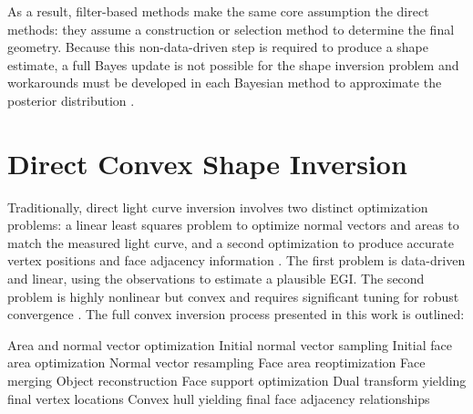 As a result, filter-based methods make the same core assumption the direct methods: they assume a construction or selection method to determine the final geometry. Because this non-data-driven step is required to produce a shape estimate, a full Bayes update is not possible for the shape inversion problem and workarounds must be developed in each Bayesian method to approximate the posterior distribution \cite{linares2012, linares2014space, campbell2023, linares2018space}.


\graphicspath{{/Users/liamrobinson/Documents/msthesis/static_images/aas_2022_figs}}

\section{Direct Convex Shape Inversion}

Traditionally, direct light curve inversion involves two distinct optimization problems: a linear least squares problem to optimize normal vectors and areas to match the measured light curve, and a second optimization to produce accurate vertex positions and face adjacency information \cite{fan2020thesis, kaasalainen2000, kaas2001shape, cabrera2021}. The first problem is data-driven and linear, using the observations to estimate a plausible EGI. The second problem is highly nonlinear but convex and requires significant tuning for robust convergence \cite{fan2019}. The full convex inversion process presented in this work is outlined:

\begin{outline}[enumerate]
  \1 Area and normal vector optimization
    \2 Initial normal vector sampling
    \2 Initial face area optimization
    \2 Normal vector resampling
    \2 Face area reoptimization
    \2 Face merging
  \1 Object reconstruction
    \2 Face support optimization
    \2 Dual transform yielding final vertex locations
    \2 Convex hull yielding final face adjacency relationships
\end{outline}

